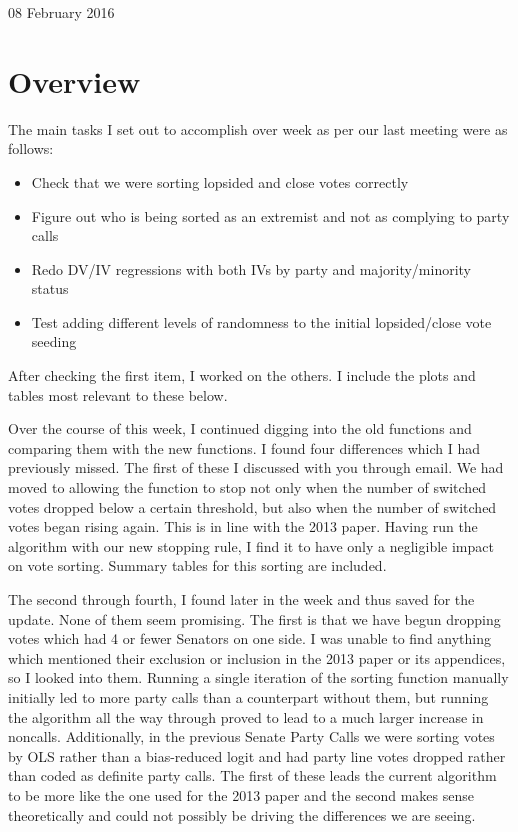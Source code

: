 \documentclass[12pt]{article}
\begin{document}
\begin{center}
\Large 08 February 2016
\end{center}

\section{Overview}

The main tasks I set out to accomplish over week as per our last meeting were as follows:

\begin{itemize}
	\item Check that we were sorting lopsided and close votes correctly

	\item Figure out who is being sorted as an extremist and not as complying to party calls

	\item Redo DV/IV regressions with both IVs by party and majority/minority status

	\item Test adding different levels of randomness to the initial lopsided/close vote seeding
\end{itemize}

\noindent
After checking the first item, I worked on the others. I include the plots and tables most relevant to these below.

Over the course of this week, I continued digging into the old functions and comparing them with the new functions. I found four differences which I had previously missed. The first of these I discussed with you through email. We had moved to allowing the function to stop not only when the number of switched votes dropped below a certain threshold, but also when the number of switched votes began rising again. This is in line with the 2013 paper. Having run the algorithm with our new stopping rule, I find it to have only a negligible impact on vote sorting. Summary tables for this sorting are included.

The second through fourth, I found later in the week and thus saved for the update. None of them seem promising. The first is that we have begun dropping votes which had 4 or fewer Senators on one side. I was unable to find anything which mentioned their exclusion or inclusion in the 2013 paper or its appendices, so I looked into them. Running a single iteration of the sorting function manually initially led to more party calls than a counterpart without them, but running the algorithm all the way through proved to lead to a much larger increase in noncalls. Additionally, in the previous Senate Party Calls we were sorting votes by OLS rather than a bias-reduced logit and had party line votes dropped rather than coded as definite party calls. The first of these leads the current algorithm to be more like the one used for the 2013 paper and the second makes sense theoretically and could not possibly be driving the differences we are seeing.
\end{document}
